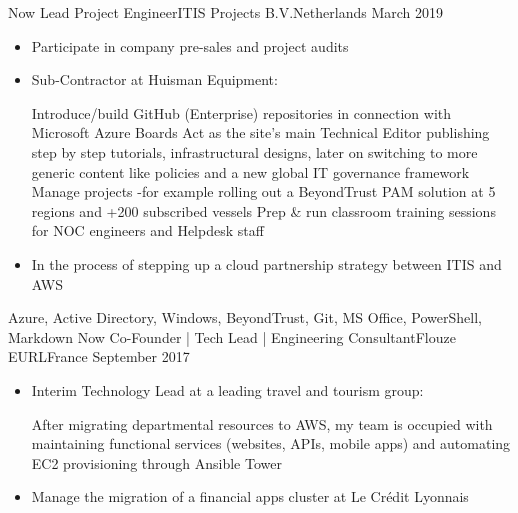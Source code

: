 %
%
%

\begin{experiences}
  \experience
    {Now}           {Lead Project Engineer}{ITIS Projects B.V.}{Netherlands}
    {March 2019}    {
                      \begin{itemize}
                        \item Participate in company pre-sales and project audits                        
                        \item Sub-Contractor at Huisman Equipment:
                        
                        \linebreak Introduce/build GitHub (Enterprise) repositories in connection with Microsoft Azure Boards
                        \linebreak Act as the site's main Technical Editor publishing step by step tutorials, infrastructural designs, later on switching to more generic content like policies and a new global IT governance framework
                        \linebreak Manage projects -for example rolling out a BeyondTrust PAM solution at 5 regions and +200 subscribed vessels
                        \linebreak Prep \& run classroom training sessions for NOC engineers and Helpdesk staff
                        
                        \item In the process of stepping up a cloud partnership strategy between ITIS and AWS           
                      \end{itemize}
                    }
                    {Azure, Active Directory, Windows, BeyondTrust, Git, MS Office, PowerShell, Markdown}
  \emptySeparator
  \experience
    {Now}           {Co-Founder | Tech Lead | Engineering Consultant}{Flouze EURL}{France}
    {September 2017}{
                      \begin{itemize}
                        \item Interim Technology Lead at a leading travel and tourism group: 
                        
                        \linebreak After migrating departmental resources to AWS, my team is occupied with maintaining functional services (websites, APIs, mobile apps) and automating EC2 provisioning through Ansible Tower                           
                        \item Manage the migration of a financial apps cluster at Le Crédit Lyonnais                       


\end{itemize}}
\end{experiences}
